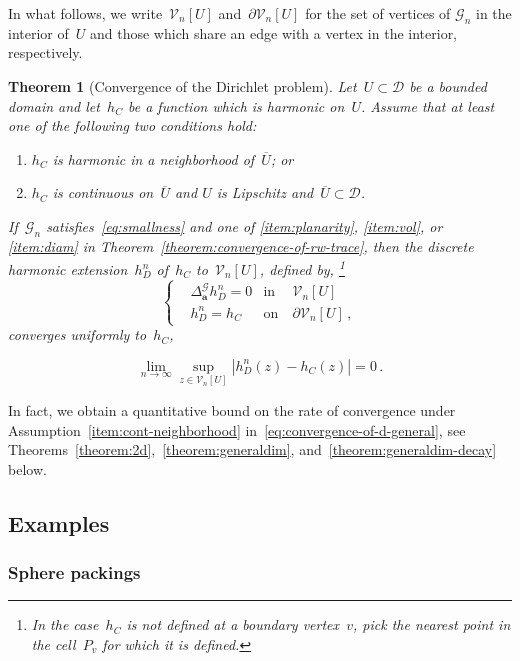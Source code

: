 \documentclass[12pt]{amsart}
\numberwithin{equation}{section}
\newtheorem{theoremA}{Theorem}[section]
\newcommand{\G}{\mathcal{G}}
\newcommand{\V}{\mathcal{V}}
\newcommand{\aDelta}{\hyperref[eq:geometric-laplacian]{{\Delta^{\mathcal{G}}_{\cond}}}}
\newcommand{\cond}{\hyperref[eq:geometric-laplacian]{\mathbf{a}}}
\begin{document}
In what follows, we write~$\V_n[U]$ and~$\partial \V_n[U]$ for the set of vertices of $\G_n$ in the interior of~$U$ and those which share an edge with a vertex in the interior, respectively. 
\begin{theoremA}[Convergence of the Dirichlet problem] \label{theorem:convergence-of-the-dirichlet-problem}
	Let~$U \subset \mathcal{D}$ be a bounded domain and let~$h_C$ be a function which is harmonic on~$U$. Assume that at least one of the following 
	two conditions hold:  
	\begin{enumerate}[label = (\alph*)]
		\item $h_C$ is harmonic in a neighborhood of~$\overline{U}$; or \label{item:cont-neighborhood}
		\item $h_C$ is continuous on~$\overline{U}$ and $U$ is Lipschitz and~$\overline{U} \subset \mathcal{D}$. \label{item:hypb}
	\end{enumerate}
	 If~$\G_n$ satisfies~\eqref{eq:smallness} and one of \ref{item:planarity}, \ref{item:vol}, or \ref{item:diam} in Theorem~\ref{theorem:convergence-of-rw-trace}, 
	then the discrete harmonic extension~$h^{n}_D$ of~$h_C$ to~$\V_n[U]$, defined by, \footnote{In the case~$h_C$ is not defined at a boundary vertex~$v$, pick the nearest point in the cell~$P_v$
		for which it is defined.}
	\[	
	\left\{	
	\begin{aligned}
		&  \aDelta h^{n}_D = 0 & \mbox{in} & \ \V_n[U] \\
		& h^{n}_D = h_C  & \mbox{on} &  \ \partial \V_n[U]    \, ,
	\end{aligned}
	\right.
	\]
	converges uniformly to~$h_C$,

	\begin{equation}
		\label{eq:convergence-of-d-general}
	\lim_{n \to \infty} \sup_{z \in \V_n[U]} |h^{n}_D(z) - h_C(z)| = 0  \, .
	\end{equation}
\end{theoremA}	
\noindent In fact, we obtain a quantitative bound on the rate of convergence under Assumption~\ref{item:cont-neighborhood} in~\eqref{eq:convergence-of-d-general}, see Theorems~\ref{theorem:2d},~\ref{theorem:generaldim}, and~\ref{theorem:generaldim-decay} below. 



\subsection{Examples}
\label{subsec:natural-examples}

\subsubsection{Sphere packings}
\end{document}
